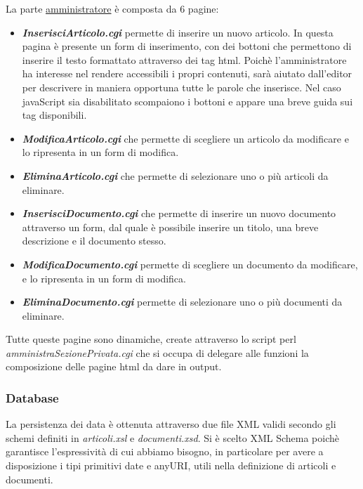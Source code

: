La parte \underline{amministratore} \`e composta da 6 pagine:
\begin{itemize}
	\item {\bfseries\textit{InserisciArticolo.cgi}} permette di inserire un nuovo articolo. In questa pagina \`e presente un form di inserimento, con dei bottoni che permettono di inserire il testo formattato attraverso dei tag html. Poich\`e l'amministratore ha interesse nel rendere accessibili i propri contenuti, sar\`a aiutato dall'editor per descrivere in maniera opportuna tutte le parole che inserisce. Nel caso javaScript sia disabilitato scompaiono i bottoni e appare una breve guida sui tag disponibili.
	\item {\bfseries\textit{ModificaArticolo.cgi}} che permette di scegliere un articolo da modificare e lo ripresenta in un form di modifica.
	\item {\bfseries\textit{EliminaArticolo.cgi}} che permette di selezionare uno o pi\`u articoli da eliminare.
	\item {\bfseries\textit{InserisciDocumento.cgi}} che permette di inserire un nuovo documento attraverso un form, dal quale \`e possibile inserire un titolo, una breve descrizione e il documento stesso.
	\item {\bfseries\textit{ModificaDocumento.cgi}} permette di scegliere un documento da modificare, e lo ripresenta in un form di modifica.
	\item {\bfseries\textit{EliminaDocumento.cgi}}  permette di selezionare uno o pi\`u documenti da eliminare.
\end{itemize}

	Tutte queste pagine sono dinamiche, create attraverso lo script perl \textit{amministraSezionePrivata.cgi} che si occupa di delegare alle funzioni la composizione delle pagine html da dare in output.
	
\subsubsection{Database}
	La persistenza dei data \`e ottenuta attraverso due file XML validi secondo gli schemi definiti in \textit{articoli.xsl} e \textit{documenti.xsd}. Si \`e scelto XML Schema poich\`e garantisce l'espressivit\`a di cui abbiamo bisogno, in particolare per avere a disposizione i tipi primitivi date e anyURI, utili nella definizione di articoli e documenti.